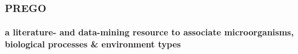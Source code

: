 \documentclass{beamer}
\begin{document}
   \begin{darkframes}
      \begin{frame}
         \frametitle{ \textbf{PREGO} }
         \framesubtitle{a literature- and data-mining resource to associate microorganisms,
         biological processes \& environment types}








      \end{frame}
   \end{darkframes}
   \fi
\end{document}
